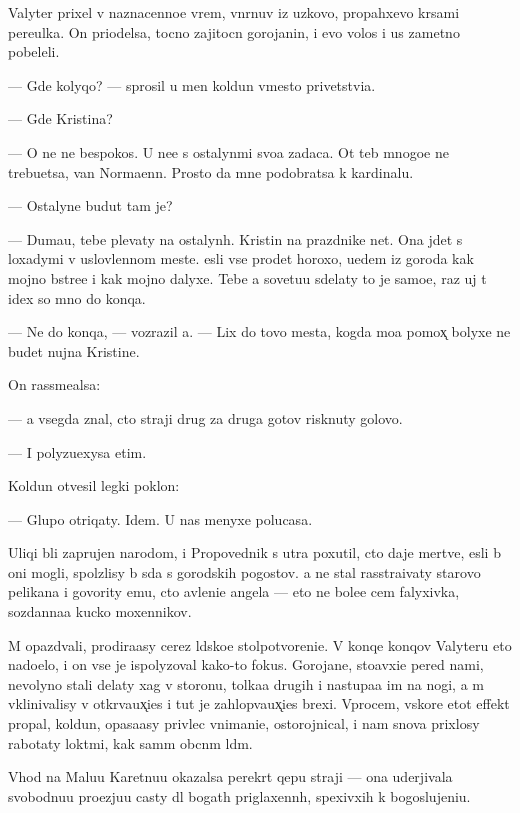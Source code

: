 \documentclass[10pt]{book}
\begin{document}
Valyter prixel v naznacenno{\y}e vrem{\ia}, v{\yi}n{\yi}rnuv iz uzkovo, propahxevo kr{\yi}sami pereulka. On priodelsa, tocno zajitocn{\yi}{\y} gorojanin, i {\y}evo volos{\yi} i us{\yi} zametno pobeleli.

— Gde kolyqo? — sprosil u men{\ia} koldun vmesto privetstvi{\y}a.

— Gde Kristina?

— O ne{\y} ne bespoko{\y}s{\ia}. U ne{\y}e s ostalyn{\yi}mi svo{\y}a zadaca. Ot teb{\ia} mnogo{\y}e ne trebu{\y}etsa, van Norma{\y}enn. Prosto da{\y} mne podobratsa k kardinalu.

— Ostalyn{\yi}{\y}e budut tam je?

— Duma{\y}u, tebe plevaty na ostalyn{\yi}h. Kristin{\yi} na prazdnike net. Ona jdet s loxadymi v uslovlennom meste. {\Y}esli vse pro{\y}det horoxo, u{\y}edem iz goroda kak mojno b{\yi}stre{\y}e i kak mojno dalyxe. Tebe {\y}a sovetu{\y}u sdelaty to je samo{\y}e, raz uj t{\yi} idex so mno{\y} do konqa.

— Ne do konqa, — vozrazil {\y}a. — Lix do tovo mesta, kogda mo{\y}a pomox̨ bolyxe ne budet nujna Kristine.

On rassme{\y}alsa:

— {\Y}a vsegda znal, cto straji drug za druga gotov{\yi} risknuty golovo{\y}.

— I polyzu{\y}exysa etim.

Koldun otvesil legki{\y} poklon:

— Glupo otriqaty. Idem. U nas menyxe polucasa.

Uliqi b{\yi}li zaprujen{\yi} narodom, i Propovednik s utra poxutil, cto daje mertv{\yi}{\y}e, {\y}esli b{\yi} oni mogli, spolzlisy b{\yi} s{\iu}da s gorodskih pogostov. {\Y}a ne stal rasstra{\y}ivaty starovo pelikana i govority {\y}emu, cto {\y}avleni{\y}e angela — eto ne bole{\y}e cem falyxivka, sozdanna{\y}a kucko{\y} moxennikov.

M{\yi} opazd{\yi}vali, prodira{\y}asy cerez l{\iu}dsko{\y}e stolpotvoreni{\y}e. V konqe konqov Valyteru eto nado{\y}elo, i on vse je ispolyzoval kako{\y}-to fokus. Gorojane, sto{\y}avxi{\y}e pered nami, nevolyno stali delaty xag v storonu, tolka{\y}a drugih i nastupa{\y}a im na nogi, a m{\yi} vklinivalisy v otkr{\yi}va{\y}ux̨i{\y}es{\ia} i tut je zahlop{\yi}va{\y}ux̨i{\y}es{\ia} brexi. Vprocem, vskore etot effekt propal, koldun, opasa{\y}asy privlec vnimani{\y}e, ostorojnical, i nam snova prixlosy rabotaty lokt{\ia}mi, kak sam{\yi}m ob{\yi}cn{\yi}m l{\iu}d{\ia}m.

V{\yi}hod na Malu{\y}u Karetnu{\y}u okazalsa perekr{\yi}t qep{\y}u straji — ona uderjivala svobodnu{\y}u pro{\y}ezju{\y}u casty dl{\ia} bogat{\yi}h priglaxenn{\yi}h, spexivxih k bogoslujeni{\y}u.
\end{document}
